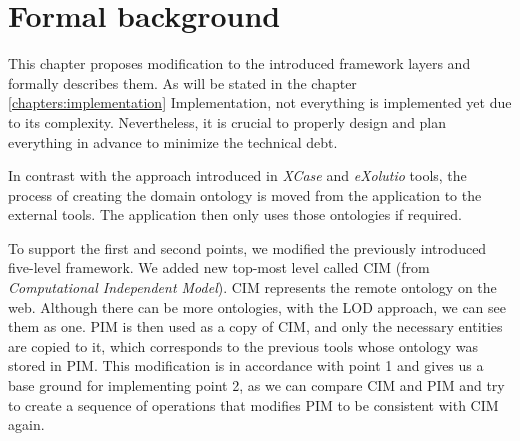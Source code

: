 \chapter{Formal background}
\label{chapters:formal-background}


This chapter proposes modification to the introduced framework layers and formally describes them. As will be stated in the chapter \ref{chapters:implementation} Implementation, not everything is implemented yet due to its complexity. Nevertheless, it is crucial to properly design and plan everything in advance to minimize the technical debt.

\medskip

In contrast with the approach introduced in \textit{XCase} and \textit{eXolutio} tools, the process of creating the domain ontology is moved from the application to the external tools. The application then only uses those ontologies if required.

To support the first and second points, we modified the previously introduced five-level framework. We added new top-most level called CIM (from \textit{Computational Independent Model}). CIM represents the remote ontology on the web. Although there can be more ontologies, with the LOD approach, we can see them as one. PIM is then used as a copy of CIM, and only the necessary entities are copied to it, which corresponds to the previous tools whose ontology was stored in PIM. This modification is in accordance with point 1 and gives us a base ground for implementing point 2, as we can compare CIM and PIM and try to create a sequence of operations that modifies PIM to be consistent with CIM again.

\smallskip

